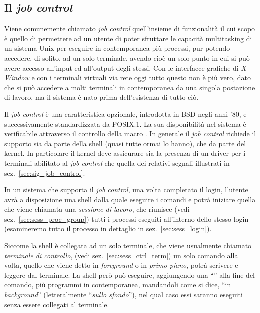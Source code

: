 \subsection{Il \textit{job control}}
\label{sec:sess_job_control_overview}

Viene comunemente chiamato \textit{job control} quell'insieme di funzionalità
il cui scopo è quello di permettere ad un utente di poter sfruttare le
capacità multitasking di un sistema Unix per eseguire in contemporanea più
processi, pur potendo accedere, di solito, ad un solo terminale, avendo cioè
un solo punto in cui si può avere accesso all'input ed all'output degli
stessi. Con le interfacce grafiche di \textit{X Window} e con i terminali
virtuali via rete oggi tutto questo non è più vero, dato che si può accedere a
molti terminali in contemporanea da una singola postazione di lavoro, ma il
sistema è nato prima dell'esistenza di tutto ciò.

Il \textit{job control} è una caratteristica opzionale, introdotta in BSD
negli anni '80, e successivamente standardizzata da POSIX.1. La sua
disponibilità nel sistema è verificabile attraverso il controllo della macro
. In generale il \textit{job control} richiede il
supporto sia da parte della shell (quasi tutte ormai lo hanno), che da parte
del kernel. In particolare il kernel deve assicurare sia la presenza di un
driver per i terminali abilitato al \textit{job control} che quella dei
relativi segnali illustrati in sez.~\ref{sec:sig_job_control}. 

In un sistema che supporta il \textit{job control}, una volta completato il
login, l'utente avrà a disposizione una shell dalla quale eseguire i comandi e
potrà iniziare quella che viene chiamata una \textsl{sessione di lavoro}, che
riunisce (vedi sez.~\ref{sec:sess_proc_group}) tutti i processi eseguiti
all'interno dello stesso login (esamineremo tutto il processo in dettaglio in
sez.~\ref{sec:sess_login}).

Siccome la shell è collegata ad un solo terminale, che viene usualmente
chiamato \textsl{terminale di controllo}, (vedi sez.~\ref{sec:sess_ctrl_term})
un solo comando alla volta, quello che viene detto in \textit{foreground} o in
\textsl{primo piano}, potrà scrivere e leggere dal terminale. La shell però
può eseguire, aggiungendo una ``\cmd{\&}'' alla fine del comando, più
programmi in contemporanea, mandandoli come si dice, ``in
\textit{background}'' (letteralmente ``\textsl{sullo sfondo}''), nel qual caso
essi saranno eseguiti senza essere collegati al terminale.

